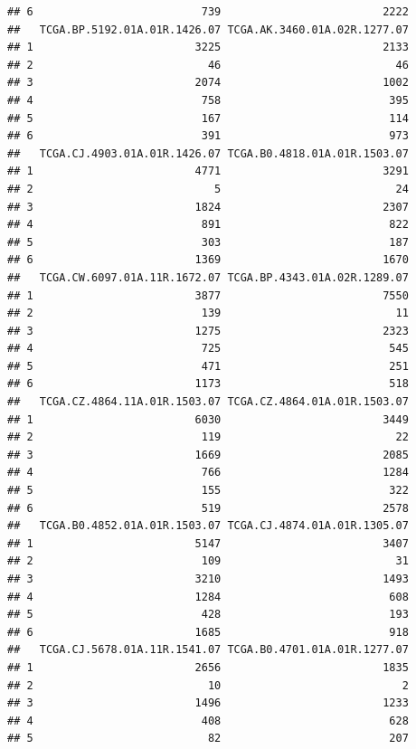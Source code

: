 \documentclass[
]{article}
\begin{document}
\begin{verbatim}
## 6                          739                         2222
##   TCGA.BP.5192.01A.01R.1426.07 TCGA.AK.3460.01A.02R.1277.07
## 1                         3225                         2133
## 2                           46                           46
## 3                         2074                         1002
## 4                          758                          395
## 5                          167                          114
## 6                          391                          973
##   TCGA.CJ.4903.01A.01R.1426.07 TCGA.B0.4818.01A.01R.1503.07
## 1                         4771                         3291
## 2                            5                           24
## 3                         1824                         2307
## 4                          891                          822
## 5                          303                          187
## 6                         1369                         1670
##   TCGA.CW.6097.01A.11R.1672.07 TCGA.BP.4343.01A.02R.1289.07
## 1                         3877                         7550
## 2                          139                           11
## 3                         1275                         2323
## 4                          725                          545
## 5                          471                          251
## 6                         1173                          518
##   TCGA.CZ.4864.11A.01R.1503.07 TCGA.CZ.4864.01A.01R.1503.07
## 1                         6030                         3449
## 2                          119                           22
## 3                         1669                         2085
## 4                          766                         1284
## 5                          155                          322
## 6                          519                         2578
##   TCGA.B0.4852.01A.01R.1503.07 TCGA.CJ.4874.01A.01R.1305.07
## 1                         5147                         3407
## 2                          109                           31
## 3                         3210                         1493
## 4                         1284                          608
## 5                          428                          193
## 6                         1685                          918
##   TCGA.CJ.5678.01A.11R.1541.07 TCGA.B0.4701.01A.01R.1277.07
## 1                         2656                         1835
## 2                           10                            2
## 3                         1496                         1233
## 4                          408                          628
## 5                           82                          207

\end{verbatim}
\end{document}
